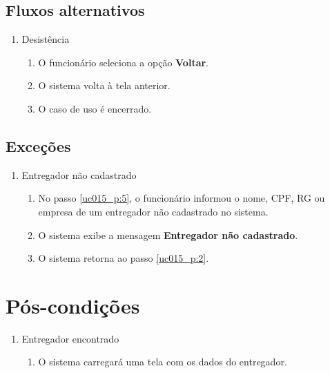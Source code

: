 \subsection{Fluxos alternativos}

\begin{enumerate}[label=A\arabic*]
	\item Desistência
	\begin{enumerate}[label*=.\arabic*]
		\item O funcionário seleciona a opção \textbf{Voltar}.
		\item O sistema volta à tela anterior.
		\item O caso de uso é encerrado.		
	\end{enumerate}	
\end{enumerate}

\subsection{Exceções}

\begin{enumerate}[label=E\arabic*]
	\item Entregador não cadastrado \label{uc015_e:1}
	\begin{enumerate}[label*=.\arabic*]
		\item[] No passo \ref{uc015_p:5}, o funcionário informou o nome, CPF, RG ou empresa de um entregador não cadastrado no sistema.
		\item O sistema exibe a mensagem \textbf{Entregador não cadastrado}.
		\item O sistema retorna ao passo \ref{uc015_p:2}.
	\end{enumerate}
\end{enumerate}

\section{Pós-condições}

\begin{enumerate}
	\item Entregador encontrado
	\begin{enumerate}
		\item O sistema carregará uma tela com os dados do entregador.
	\end{enumerate}
\end{enumerate}